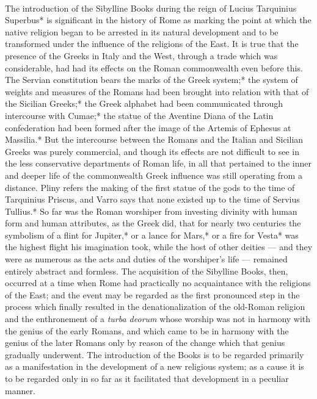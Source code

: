 \documentclass[a4paper, 11pt, oneside, polutonikogreek, english]{article}
\begin{document}
\paragraph{}
The introduction of the Sibylline Books during the reign of Lucius Tarquinius Superbus* is significant in the history of Rome as marking the point at which the native religion began to be arrested in its natural development and to be transformed under the influence of the religions of the East. It is true that the presence of the Greeks in Italy and the West, through a trade which was considerable, had had its effects on the Roman commonwealth even before this. The Servian constitution bears the marks of the Greek system;* the system of weights and measures of the Romans had been brought into relation with that of the Sicilian Greeks;* the Greek alphabet had been communicated through intercourse with Cumae;* the statue of the Aventine Diana of the Latin confederation had been formed after the image of the Artemis of Ephesus at Massilia.* But the intercourse between the Romans and the Italian and Sicilian Greeks was purely commercial, and though its effects are not difficult to see in the less conservative departments of Roman life, in all that pertained to the inner and deeper life of the commonwealth Greek influence was still operating from a distance. Pliny refers the making of the first statue of the gods to the time of Tarquinius Priscus, and Varro says that none existed up to the time of Servius Tullius.* So far was the Roman worshiper from investing divinity with human form and human attributes, as the Greek did, that for nearly two centuries the symbolism of a flint for Jupiter,* or a lance for Mars,* or a fire for Vesta* was the highest flight his imagination took, while the host of other deities --- and they were as numerous as the acts and duties of the worshiper's life --- remained entirely abstract and formless. The acquisition of the Sibylline Books, then, occurred at a time when Rome had practically no acquaintance with the religions of the East; and the event may be regarded as the first pronounced step in the process which finally resulted in the denationalization of the old-Roman religion and the enthronement of a \emph{turba deorum} whose worship was not in harmony with the genius of the early Romans, and which came to be in harmony with the genius of the later Romans only by reason of the change which that genius gradually underwent. The introduction of the Books is to be regarded primarily as a manifestation in the development of a new religious system; as a cause it is to be regarded only in so far as it facilitated that development in a peculiar manner.
\end{document}
